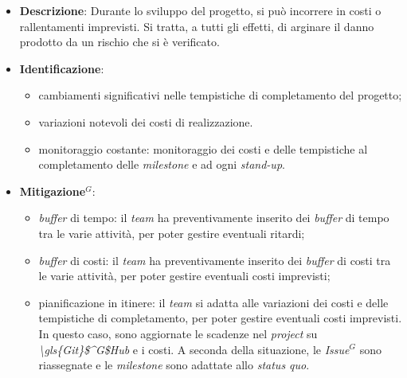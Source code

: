 \label{risk:costi e tempi imprevisti}
\begin{itemize}
	\item \textbf{Descrizione}:
	      Durante lo sviluppo del progetto, si può incorrere in costi o
	      rallentamenti imprevisti. Si tratta, a tutti gli effetti, di arginare
	      il danno prodotto da un rischio che si è verificato.
	\item \textbf{Identificazione}:
	      \begin{itemize}
		      \item cambiamenti significativi nelle tempistiche di completamento
		            del progetto;

		      \item variazioni notevoli dei costi di realizzazione.

		      \item monitoraggio costante: monitoraggio dei costi e delle
		            tempistiche al completamento delle \textit{milestone} e
		            ad ogni \textit{stand-up}.
	      \end{itemize}
	\item \textbf{\gls{Mitigazione}$^G$}:
	      \begin{itemize}
		      \item \textit{buffer} di tempo: il \textit{team} ha
		            preventivamente inserito dei \textit{buffer} di tempo
		            tra le varie attività, per poter gestire eventuali
		            ritardi;

		      \item \textit{buffer} di costi: il \textit{team} ha
		            preventivamente inserito dei \textit{buffer} di costi
		            tra le varie attività, per poter gestire eventuali
		            costi imprevisti;

		      \item pianificazione in itinere: il \textit{team} si adatta
		            alle variazioni dei costi e delle tempistiche di
		            completamento, per poter gestire eventuali costi
		            imprevisti. In questo caso, sono aggiornate le scadenze
		            nel \textit{project} su \textit{\gls{\gls{Git}$^G$Hub}} e i costi.
		            A seconda della situazione, le \textit{\gls{Issue}$^G$} sono
		            riassegnate e le \textit{milestone} sono adattate allo
		            \textit{status quo}.
	      \end{itemize}
\end{itemize}
